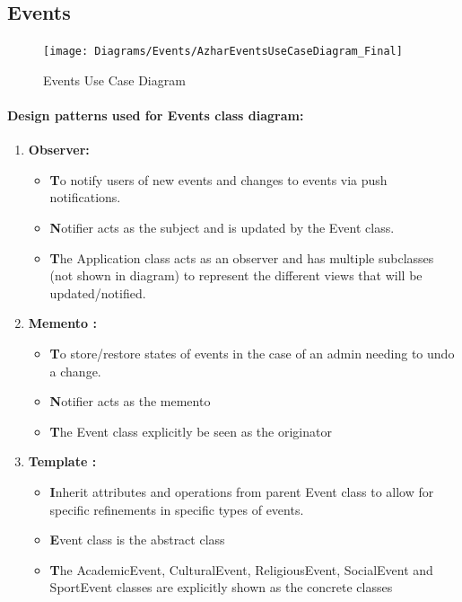 \documentclass[11pt]{article}
\begin{document}
	\subsection{Events}
	\begin{figure}[!h]
        \centering
        \texttt{[image: Diagrams/Events/AzharEventsUseCaseDiagram\_Final]}
        \caption{Events Use Case Diagram}
        \label{fig:events_use_case}
    \end{figure}
   
   \paragraph{Design patterns used for Events class diagram: }
		\begin{enumerate}
			\item \textbf{Observer:}
			\begin{itemize}
				\item \textbf To notify users of new events and changes to events via push notifications.
				\item \textbf Notifier acts as the subject and is updated by the Event class.
				\item \textbf The Application class acts as an observer and has multiple subclasses (not shown in diagram) to represent the different views that will be updated/notified.
			\end{itemize}
			
			\item \textbf{Memento :}
			\begin{itemize}
				\item \textbf To store/restore states of events in the case of an admin needing to undo a change.
				\item \textbf Notifier acts as the memento
				\item \textbf The Event class explicitly be seen as the originator
			\end{itemize}
			
			\item \textbf{Template :}
			\begin{itemize}
				\item \textbf Inherit attributes and operations from parent Event class to allow for specific refinements in specific types of events.
				\item \textbf Event class is the abstract class
				\item \textbf The AcademicEvent, CulturalEvent, ReligiousEvent, SocialEvent and SportEvent classes are explicitly shown as the concrete classes
			\end{itemize}	
		\end{enumerate}
		
\end{document}
